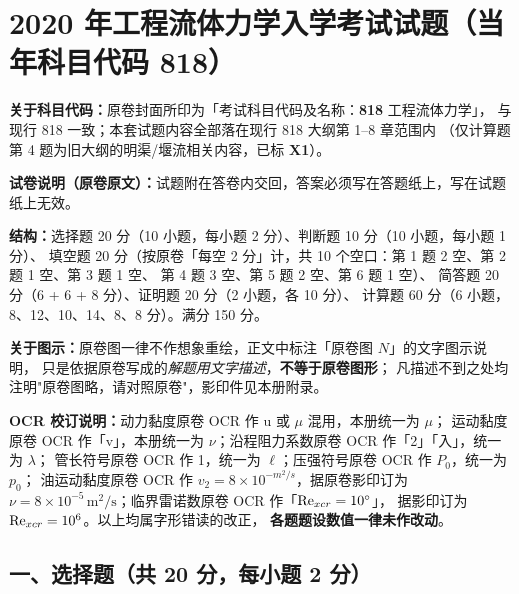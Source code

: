 \chapter{2020 年工程流体力学入学考试试题（当年科目代码 818）}

\begin{tishi}
\textbf{关于科目代码：}原卷封面所印为「考试科目代码及名称：\textbf{818} 工程流体力学」，
与现行 818 一致；本套试题内容全部落在现行 818 大纲第 1--8 章范围内
（仅计算题第 4 题为旧大纲的明渠/堰流相关内容，已标 \textbf{X1}）。

\textbf{试卷说明（原卷原文）：}试题附在答卷内交回，答案必须写在答题纸上，写在试题纸上无效。

\textbf{结构：}选择题 20 分（10 小题，每小题 2 分）、判断题 10 分（10 小题，每小题 1 分）、
填空题 20 分（按原卷「每空 2 分」计，共 10 个空口：第 1 题 2 空、第 2 题 1 空、第 3 题 1 空、
第 4 题 3 空、第 5 题 2 空、第 6 题 1 空）、
简答题 20 分（6 + 6 + 8 分）、证明题 20 分（2 小题，各 10 分）、
计算题 60 分（6 小题，8、12、10、14、8、8 分）。满分 150 分。

\textbf{关于图示：}原卷图一律不作想象重绘，正文中标注「原卷图 $N$」的文字图示说明，
只是依据原卷写成的\emph{解题用文字描述}，\textbf{不等于原卷图形}；
凡描述不到之处均注明"原卷图略，请对照原卷"，影印件见本册附录。

\textbf{OCR 校订说明：}动力黏度原卷 OCR 作 u 或 $\mu$ 混用，本册统一为 $\mu$；
运动黏度原卷 OCR 作「v」，本册统一为 $\nu$；沿程阻力系数原卷 OCR 作「2」「入」，统一为 $\lambda$；
管长符号原卷 OCR 作 1，统一为 $\ell$；压强符号原卷 OCR 作 $P_0$，统一为 $p_0$；
油运动黏度原卷 OCR 作 $v_2=8\times10^{-m^2/s}$，据原卷影印订为
$\nu=8\times10^{-5}\,\mathrm{m^2/s}$；临界雷诺数原卷 OCR 作「$\mathrm{Re}_{xcr}=10^\circ$」，
据影印订为 $\mathrm{Re}_{xcr}=10^{6}$。以上均属字形错读的改正，
\textbf{各题题设数值一律未作改动}。
\end{tishi}

\section{一、选择题（共 20 分，每小题 2 分）}


